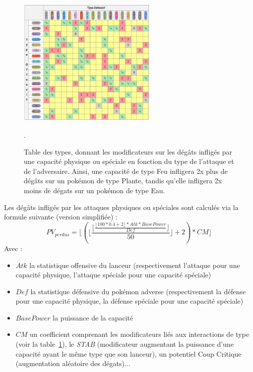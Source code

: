 \documentclass[a4paper,12pt]{article}
\begin{document}
\begin{figure}[!h]
    \centering
    \includegraphics[width=0.6\textwidth]{Image/table-des-types-pour-pokemon-arceus.jpg}
    \caption{Table des types, donnant les modificateurs sur les dégâts infligés
    par une capacité physique ou spéciale en fonction du type de l'attaque et de
    l'adversaire. Ainsi, une capacité de type Feu infligera 2x plus de dégâts
    sur un pokémon de type Plante, tandis qu'elle infligera 2x moins de dégats
    sur un pokémon de type Eau.}.
    \label{fig:tabletype}
\end{figure}

Les dégâts infligés par les attaques physiques ou spéciales sont calculés via la
formule suivante (version simplifiée) :
\begin{equation}
    PV_{perdus}=\lfloor ( \lfloor \frac{\lfloor \frac{\lfloor 100*0.4+2 \rfloor * Atk * BasePower}{Def}\rfloor}{50}\rfloor +2)*CM \rfloor
\end{equation}
Avec :
\begin{itemize}
    \item $Atk$ la statistique offensive du lanceur (respectivement l'attaque
    pour une capacité physique, l'attaque spéciale pour une capacité spéciale)
    \item $Def$ la statistique défensive du pokémon adverse (respectivement la
    défense pour une capacité physique, la défense spéciale pour une capacité
    spéciale)
    \item $BasePower$ la puissance de la capacité
    \item $CM$ un coefficient comprenant les modificateurs liés aux interactions
    de type (voir la table~\ref{fig:tabletype}), le \textit{STAB} (modificateur
    augmentant la puissance d'une capacité ayant le même type que son lanceur),
    un potentiel Coup Critique (augmentation aléatoire des dégats)...
\end{itemize}
\end{document}
